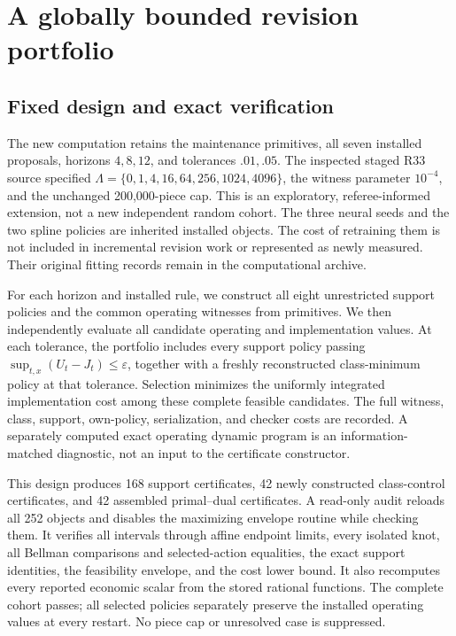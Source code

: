 \section{A globally bounded revision portfolio}\label{sec:global-results}
\subsection{Fixed design and exact verification}
The new computation retains the maintenance primitives, all seven installed proposals, horizons $4,8,12$, and tolerances $.01,.05$. The inspected staged R33 source specified
$\Lambda=\{0,1,4,16,64,256,1024,4096\}$,
the witness parameter $10^{-4}$, and the unchanged 200,000-piece cap. This is an exploratory, referee-informed extension, not a new independent random cohort. The three neural seeds and the two spline policies are inherited installed objects. The cost of retraining them is not included in incremental revision work or represented as newly measured. Their original fitting records remain in the computational archive.

For each horizon and installed rule, we construct all eight unrestricted support policies and the common operating witnesses from primitives. We then independently evaluate all candidate operating and implementation values. At each tolerance, the portfolio includes every support policy passing $\sup_{t,x}(U_t-J_t)\le\varepsilon$, together with a freshly reconstructed class-minimum policy at that tolerance. Selection minimizes the uniformly integrated implementation cost among these complete feasible candidates. The full witness, class, support, own-policy, serialization, and checker costs are recorded. A separately computed exact operating dynamic program is an information-matched diagnostic, not an input to the certificate constructor.

This design produces 168 support certificates, 42 newly constructed class-control certificates, and 42 assembled primal--dual certificates. A read-only audit reloads all 252 objects and disables the maximizing envelope routine while checking them. It verifies all intervals through affine endpoint limits, every isolated knot, all Bellman comparisons and selected-action equalities, the exact support identities, the feasibility envelope, and the cost lower bound. It also recomputes every reported economic scalar from the stored rational functions. The complete cohort passes; all selected policies separately preserve the installed operating values at every restart. No piece cap or unresolved case is suppressed.

